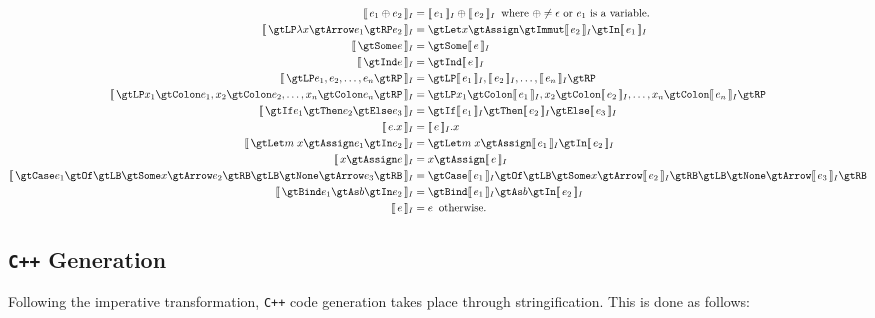\documentclass{article}
\begin{document}
    \begin{align}
        \intI{e_1 \oplus e_2}
            &= \intI{e_1} \oplus \intI{e_2} \;\; \text{where $\oplus \neq \epsilon$ or $e_1$ is a variable.} \\
        \intI{\gtLP \lambda x \gtArrow e_1 \gtRP e_2}
            &= \gtLet x \gtAssign \gtImmut \intI{e_2} \gtIn \intI{e_1} \\
        \intI{\gtSome e}
            &= \gtSome \intI{e} \\
        \intI{\gtInd e}
            &= \gtInd \intI{e} \\
        \intI{\gtLP e_1, e_2, \ldots, e_n \gtRP}
            &= \gtLP \intI{e_1}, \intI{e_2}, \ldots, \intI{e_n} \gtRP \\
        \intI{\gtLP x_1 \gtColon e_1, x_2 \gtColon e_2, \ldots, x_n \gtColon e_n \gtRP}
            &= \gtLP x_1 \gtColon \intI{e_1}, x_2 \gtColon \intI{e_2}, \ldots, x_n \gtColon \intI{e_n} \gtRP \\
        \intI{\gtIf e_1 \gtThen e_2 \gtElse e_3}
            &= \gtIf \intI{e_1} \gtThen \intI{e_2} \gtElse \intI{e_3} \\
        \intI{e.x}
            &= \intI{e}.x \\
        \intI{\gtLet m \; x \gtAssign e_1 \gtIn e_2}
            &= \gtLet m \; x \gtAssign \intI{e_1} \gtIn \intI{e_2} \\
        \intI{x \gtAssign e}
            &= x \gtAssign \intI{e} \\
        \intI{\gtCase e_1 \gtOf \gtLB \gtSome x \gtArrow e_2 \gtRB \gtLB \gtNone \gtArrow e_3 \gtRB}
            &= \gtCase \intI{e_1} \gtOf \gtLB \gtSome x \gtArrow \intI{e_2} \gtRB
                \gtLB \gtNone \gtArrow \intI{e_3} \gtRB \\
        \intI{\gtBind e_1 \gtAs b \gtIn e_2}
            &= \gtBind \intI{e_1} \gtAs b \gtIn \intI{e_2} \\
        \intI{e}
            &= e \;\; \text{otherwise.}
    \end{align}

    \subsection{\texttt{C++} Generation}

    Following the imperative transformation, \texttt{C++} code generation takes place through
    stringification. This is done as follows:
\end{document}
